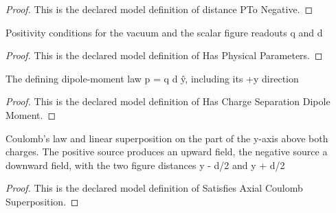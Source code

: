 \begin{proof}
  This is the declared model definition of distance PTo Negative.
\end{proof}
\begin{definition}
  \label{def:physics:phyx-mini-0997:phyxminiproblems-problemphyxmini0997-hasphysicalparameters}
  Positivity conditions for the vacuum and the scalar figure readouts q and d
\end{definition}
\begin{proof}
  This is the declared model definition of Has Physical Parameters.
\end{proof}
\begin{definition}
  \label{def:physics:phyx-mini-0997:phyxminiproblems-problemphyxmini0997-haschargeseparationdipolemoment}
  The defining dipole-moment law p⃗ = q d ŷ, including its +y direction
\end{definition}
\begin{proof}
  This is the declared model definition of Has Charge Separation Dipole Moment.
\end{proof}
\begin{definition}
  \label{def:physics:phyx-mini-0997:phyxminiproblems-problemphyxmini0997-satisfiesaxialcoulombsuperposition}
  Coulomb's law and linear superposition on the part of the y-axis above both charges. The positive source produces an upward field, the negative source a downward field, with the two figure distances y - d/2 and y + d/2
\end{definition}
\begin{proof}
  This is the declared model definition of Satisfies Axial Coulomb Superposition.
\end{proof}
